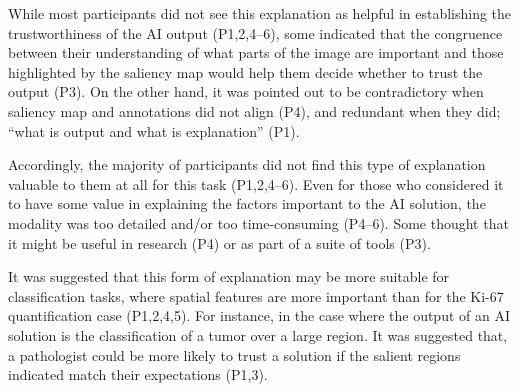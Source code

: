 While most participants did not see this explanation as helpful in establishing the trustworthiness of the AI output (P1,2,4--6), some indicated that the congruence between their understanding of what parts of the image are important and those highlighted by the saliency map would help them decide whether to trust the output (P3). On the other hand, it was pointed out to be contradictory when saliency map and annotations did not align (P4), and redundant when they did; “what is output and what is explanation” (P1).


Accordingly, the majority of participants did not find this type of explanation valuable to them at all for this task (P1,2,4--6). Even for those who considered it to have some value in explaining the factors important to the AI solution, the modality was too detailed and/or too time-consuming (P4--6). Some thought that it might be useful in research (P4) or as part of a suite of tools (P3).


It was suggested that this form of explanation may be more suitable for classification tasks, where spatial features are more important than for the Ki-67 quantification case (P1,2,4,5). For instance, in the case where the output of an AI solution is the classification of a tumor over a large region. It was suggested that, a pathologist could be more likely to trust a solution if the salient regions indicated match their expectations (P1,3).



